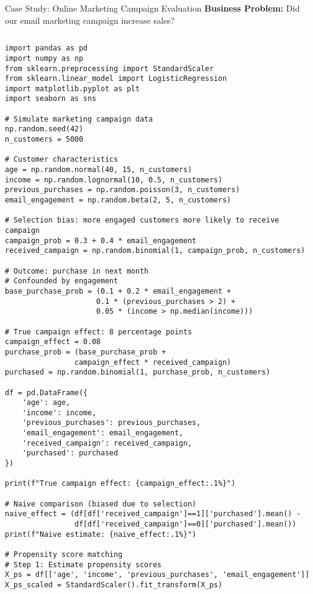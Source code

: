 \documentclass[aspectratio=169,11pt]{beamer}
\begin{document}
\begin{frame}[fragile]{Case Study: Online Marketing Campaign Evaluation}
\textbf{Business Problem:} Did our email marketing campaign increase sales?

\begin{columns}
\begin{column}{0.55\textwidth}
\begin{lstlisting}[basicstyle=\ttfamily\tiny]
import pandas as pd
import numpy as np
from sklearn.preprocessing import StandardScaler
from sklearn.linear_model import LogisticRegression
import matplotlib.pyplot as plt
import seaborn as sns

# Simulate marketing campaign data
np.random.seed(42)
n_customers = 5000

# Customer characteristics
age = np.random.normal(40, 15, n_customers)
income = np.random.lognormal(10, 0.5, n_customers)
previous_purchases = np.random.poisson(3, n_customers)
email_engagement = np.random.beta(2, 5, n_customers)

# Selection bias: more engaged customers more likely to receive campaign
campaign_prob = 0.3 + 0.4 * email_engagement
received_campaign = np.random.binomial(1, campaign_prob, n_customers)

# Outcome: purchase in next month
# Confounded by engagement
base_purchase_prob = (0.1 + 0.2 * email_engagement + 
                     0.1 * (previous_purchases > 2) +
                     0.05 * (income > np.median(income)))

# True campaign effect: 8 percentage points
campaign_effect = 0.08
purchase_prob = (base_purchase_prob + 
                campaign_effect * received_campaign)
purchased = np.random.binomial(1, purchase_prob, n_customers)

df = pd.DataFrame({
    'age': age,
    'income': income,
    'previous_purchases': previous_purchases,
    'email_engagement': email_engagement,
    'received_campaign': received_campaign,
    'purchased': purchased
})

print(f"True campaign effect: {campaign_effect:.1%}")

# Naive comparison (biased due to selection)
naive_effect = (df[df['received_campaign']==1]['purchased'].mean() - 
                df[df['received_campaign']==0]['purchased'].mean())
print(f"Naive estimate: {naive_effect:.1%}")

# Propensity score matching
# Step 1: Estimate propensity scores
X_ps = df[['age', 'income', 'previous_purchases', 'email_engagement']]
X_ps_scaled = StandardScaler().fit_transform(X_ps)


\end{lstlisting}
\end{column}
\end{columns}
\end{frame}
\end{document}

